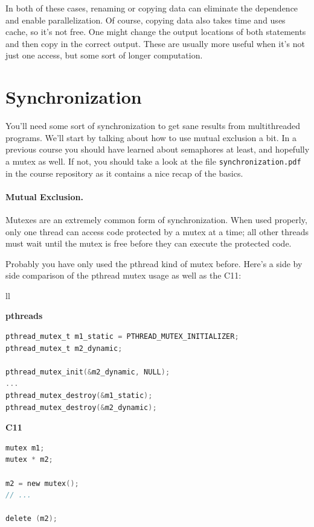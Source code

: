\documentclass[a4paper]{report}
\newcommand{\CPP}{C\nolinebreak\hspace{-.05em}\raisebox{.4ex}{\tiny\bf +}\nolinebreak\hspace{-.10em}\raisebox{.4ex}{\tiny\bf +}}
\def\CPP{{C\nolinebreak[4]\hspace{-.05em}\raisebox{.4ex}{\tiny\bf ++}}}
\begin{document}
In both of these cases, renaming or copying data can
eliminate the dependence and enable parallelization. Of course,
copying data also takes time and uses cache, so it's not free. One
might change the output locations of both statements and then copy in
the correct output. These are usually more useful when it's not just one
access, but some sort of longer computation.




\section*{Synchronization}
You'll need some sort of synchronization to get sane results from
multithreaded programs. We'll start by talking about how to use
mutual exclusion a bit. In a previous course you should have learned about semaphores at least, and hopefully a mutex as well. If not, you should take a look at the file \texttt{synchronization.pdf} in the course repository as it contains a nice recap of the basics. 


\paragraph{Mutual Exclusion.} Mutexes are an extremely common form of synchronization. When used properly, only one thread can access code protected by a mutex at a time; all other threads must wait until the mutex is free before they can execute the protected code.

Probably you have only used the pthread kind of mutex before. Here's a side by side comparison of the pthread mutex usage as well as the \CPP11:
    
    \begin{tabular}{ll}
      \begin{minipage}{.65\textwidth}
        {\bf pthreads}
  \begin{lstlisting}[language=C]
pthread_mutex_t m1_static = PTHREAD_MUTEX_INITIALIZER;
pthread_mutex_t m2_dynamic;

pthread_mutex_init(&m2_dynamic, NULL);
...
pthread_mutex_destroy(&m1_static);
pthread_mutex_destroy(&m2_dynamic);
  \end{lstlisting}
      \end{minipage}
      \begin{minipage}{.35\textwidth}
        {\bf \CPP11}
  \begin{lstlisting}[language=C]
mutex m1;
mutex * m2;

m2 = new mutex();
// ...

delete (m2);
  \end{lstlisting}
      \end{minipage}
    \end{tabular}
\end{document}
